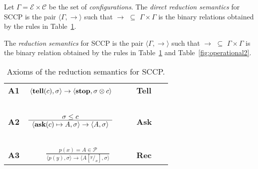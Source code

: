 \documentclass{llncs}
\def\C{{\mathcal C}}
\newcommand{\tell}{{\bf tell}}
\newcommand{\ask}{{\bf ask}}
\newcommand{\ostop}{{\bf stop}}
\def\C{{\mathcal C}}
\def\odiv{\, {\ominus\hspace{-7.7pt} \div} \,}
\begin{document}
\begin{definition}[Reductions]\label{def:reductions}
Let $\Gamma = {\mathcal E} \times \C$ be the set of \emph{configurations}.
The \emph{direct reduction semantics} for SCCP is the pair 
$\langle \Gamma,  \to \rangle$
such that $\to \, \, \subseteq \, \,\Gamma \times   \Gamma$ is the 
binary relations obtained by the rules in 
Table~\ref{fig:operational}.

The \emph{reduction semantics} for SCCP is the pair 
$\langle \Gamma,  \rightarrow \rangle$
such that $\rightarrow \, \, \subseteq \, \,\Gamma \times   \Gamma$ is the
binary relation obtained by the rules in 
Table~\ref{fig:operational} and Table~\ref{fig:operational2}.
\end{definition}


\begin{table}  %
   \begin{center}
   \begin{tabular}{lcll} 
   \mbox{\bf A1}& $ {\displaystyle \langle \hbox{\tell}(c), \sigma \rangle \to \langle 
   \hbox{\ostop}, \sigma \otimes c\rangle}$
   \ \ \ & \bf{Tell}&
  \\ 
  &\mbox{   }&\mbox{   } &\mbox{   }
  \\
  \mbox{\bf A2}& $\frac {\displaystyle \sigma \leq c}{\displaystyle
  	\begin{array}{l} \langle \hbox{\ask}(c) \mapsto A, \sigma \rangle \to \langle A, \sigma \rangle   	\end{array}}$
    \ \ \ & \bf{Ask}&
    \\
    &\mbox{   }&\mbox{   }&
    \\
  \mbox{\bf A3}& $\frac {\displaystyle p(x) = A \in \mathcal{P} }
  {\displaystyle\langle p(y),\sigma\rangle \to \langle A[^y/_x], \sigma \rangle}$ 
  &\bf{Rec}&
  \end{tabular}
  \end{center}
\caption{Axioms of the reduction semantics for SCCP.}
\label{fig:operational}
\end{table}
\end{document}
